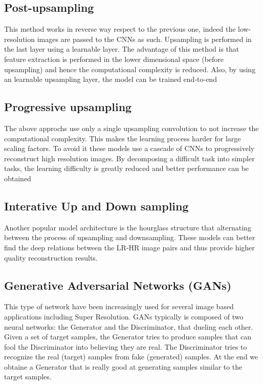 \documentclass[10pt,twocolumn,letterpaper]{article}
\begin{document}
\subsection{Post-upsampling}
This method works in reverse way respect to the previous one, indeed the low-resolution images are passed to the CNNs as such. Upsampling is performed in the last layer using a learnable layer. The advantage of this method is that feature extraction is performed in the lower dimensional space (before upsampling) and hence the computational complexity is reduced. Also, by using an learnable upsampling layer, the model can be trained end-to-end
\subsection{Progressive upsampling}
The above approchs use only a single upsampling convolution to not increase the computational complexity. This makes the learning process harder for large scaling factors. To avoid it these models  use a cascade of CNNs to progressively reconstruct high resolution images. By decomposing a difficult task into simpler tasks, the learning difficulty is greatly reduced and better performance can be obtained
\subsection{Interative Up and Down sampling}
Another popular model architecture is the hourglass structure that alternating between the process of upsampling and downsampling. These models can better find the deep relations between the LR-HR image pairs and thus provide higher quality reconstruction results.
\subsection{Generative Adversarial Networks (GANs)}
This type of network have been increasingly used for several image based applications including Super Resolution. GANs typically is composed of two neural networks: the Generator and the Discriminator, that dueling each other. Given a set of target samples, the Generator tries to produce samples that can fool the Discriminator into believing they are real. The Discriminator tries to recognize the real (target) samples from fake (generated) samples. At the end we obtaine a Generator that is really good at generating samples similar to the target samples.
\end{document}
